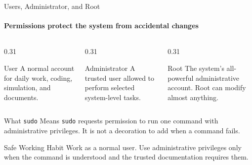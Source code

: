 \begin{frame}{Users, Administrator, and Root}
\framesubtitle{Permissions protect the system from accidental changes}

\begin{columns}[T,onlytextwidth]
    \begin{column}{0.31\textwidth}
        \begin{block}{User}
            A normal account for daily work, coding, simulation, and documents.
        \end{block}
    \end{column}
    \hfill
    \begin{column}{0.31\textwidth}
        \begin{block}{Administrator}
            A trusted user allowed to perform selected system-level tasks.
        \end{block}
    \end{column}
    \hfill
    \begin{column}{0.31\textwidth}
        \begin{block}{Root}
            The system's all-powerful administrative account.
            Root can modify almost anything.
        \end{block}
    \end{column}
\end{columns}

\pause

\begin{exampleblock}{What \texttt{sudo} Means}
    \texttt{sudo} requests permission to run one command with administrative
    privileges. It is not a decoration to add when a command fails.
\end{exampleblock}

\begin{alertblock}{Safe Working Habit}
    Work as a normal user. Use administrative privileges only when the command
    is understood and the trusted documentation requires them.
\end{alertblock}
\end{frame}


